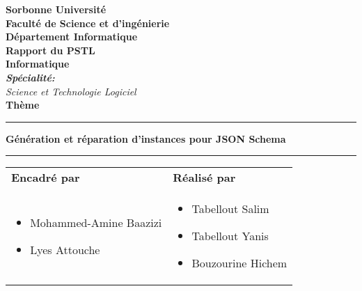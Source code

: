 \begin{titlepage}
\begin{center}
        
        {\bf {\large Sorbonne Université}}\\
        {\bf Faculté de Science et d'ingénierie} \\
        { \textbf{D\'epartement Informatique}}\\ \vspace{0.5cm}
        \Huge{\textbf{Rapport du PSTL}} \\ \Large{\textbf{Informatique}} \\\vspace{0.3cm}
        \large{\emph{\textbf{Spécialité:} \\ Science et Technologie Logiciel}}\\ \vspace{0.5cm}
        \huge{\textbf{Thème}}\\ %
        \noindent\rule{\textwidth}{1mm}
        \Large{\textbf{Génération et réparation d’instances
        pour JSON Schema
        }}
        \noindent\rule{\textwidth}{1mm}
        \end{center}
        \vspace{0.3cm}
        \begin{tabular}{ p{9cm}  p{6cm} }
                \textbf{Encadré par} & \textbf{Réalisé par} \\
                \begin{itemize}
                        \item[\textbullet] { Mohammed-Amine Baazizi }
                        \newline
                        \item[\textbullet] { Lyes Attouche }
                \end{itemize}
                &
                \begin{itemize}
                        \item[\textbullet]{Tabellout Salim}
                        \newline
                        \item[\textbullet]{Tabellout Yanis}
                    \newline
                        \item[\textbullet]{Bouzourine Hichem}
                \end{itemize}
        \end{tabular}
        

\end{titlepage}
